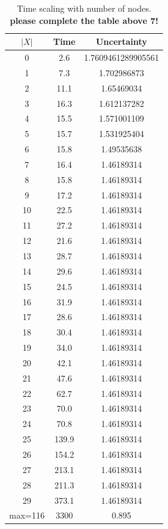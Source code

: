 \begin{table}[h!]
	\centering
	\begin{tabular}{|c|c|c|}
		\hline
		$|X|$ & Time & Uncertainty\\ 
		\hline	0 & 2.6 & 1.7609461289905561\\
		\hline	1 & 7.3 & 1.702986873\\
		\hline	2 & 11.1 & 1.65469034\\
		\hline	3 & 16.3 & 1.612137282\\
		\hline	4 & 15.5 & 1.571001109\\
		\hline	5 & 15.7 & 1.531925404\\
		\hline	6 & 15.8 & 1.49535638\\
		\hline	7 & 16.4 & 1.46189314\\
		\hline	8 &  15.8 & 1.46189314\\
		\hline	9 &  17.2 & 1.46189314\\
		\hline	10 & 22.5 & 1.46189314\\
		\hline	11 & 27.2 & 1.46189314\\
		\hline	12 & 21.6 & 1.46189314\\
		\hline	13 & 28.7 & 1.46189314\\
		\hline	14 & 29.6 & 1.46189314\\
		\hline	15 & 24.5 & 1.46189314\\
		\hline	16 & 31.9 & 1.46189314\\
		\hline	17 & 28.6 & 1.46189314\\
		\hline	18 & 30.4 & 1.46189314\\
		\hline	19 & 34.0 & 1.46189314\\
		\hline	20 & 42.1 & 1.46189314\\
		\hline	21 & 47.6 & 1.46189314\\
		\hline	22 & 62.7 & 1.46189314\\
		\hline	23 & 70.0 & 1.46189314\\
		\hline	24 & 70.8 & 1.46189314\\
		\hline	25 & 139.9 & 1.46189314\\
		\hline	26 & 154.2 & 1.46189314\\
		\hline	27 & 213.1 & 1.46189314\\
		\hline	28 & 211.3 & 1.46189314\\
		\hline	29 & 373.1 & 1.46189314\\
		\hline max=116 & 3300 & 0.895\\ 
		\hline
		
	\end{tabular}
	\caption{Time scaling with number of nodes. {\bf please complete the table above 7!}}
	\label{table14}
\end{table}


